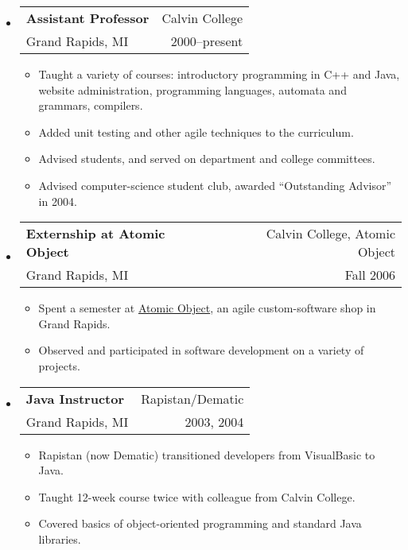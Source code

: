 \documentclass[letterpaper,10pt]{article}
\makeatletter
\newcommand{\resitem}[1]{\vspace{-2pt} \item #1}
\newcommand{\ressubheading}[4]{ 
\begin{tabular*}{7in}{l@{\extracolsep{\fill}}r}
	\textbf{#1} & #2 \\
	{#3} & {#4} \\
\end{tabular*}
\vspace{-6pt}}
\makeatother
\begin{document}
\begin{itemize}
	\item \ressubheading{Assistant Professor}{Calvin College}{Grand Rapids, MI}{2000--present} 
    \vspace{-1mm}
	  \begin{itemize}
		\resitem{Taught a variety of courses: introductory programming in C++ and Java, website administration, programming languages, automata and grammars, compilers.}
		\resitem{Added unit testing and other agile techniques to the curriculum.}
	  \vspace{-1mm}
		\resitem{Advised students, and served on department and college committees.}
		\resitem{Advised computer-science student club, awarded ``Outstanding Advisor'' in 2004.}
	\end{itemize}
	
	\item \ressubheading{Externship at Atomic Object}{Calvin College, Atomic Object}{Grand Rapids, MI}{Fall 2006}
  \vspace{-1mm}
	  \begin{itemize}
	   \resitem{Spent a semester at \href{http://www.atomicobject.com}{Atomic Object}, an agile custom-software shop in Grand Rapids.}
	   \resitem{Observed and participated in software development on a variety of projects.}
	  \end{itemize}
	
	\item \ressubheading{Java Instructor}{Rapistan/Dematic}{Grand Rapids, MI}{2003, 2004}
  \vspace{-1mm}
	\begin{itemize}
	  \vspace{-1mm}
	  \resitem{Rapistan (now Dematic) transitioned developers from VisualBasic to Java.}
		\resitem{Taught 12-week course twice with colleague from Calvin College.}
		\resitem{Covered basics of object-oriented programming and standard Java libraries.}
	\end{itemize}
	

\end{itemize}
\end{document}
